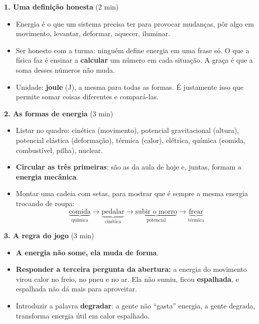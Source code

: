 \documentclass[11pt,a4paper]{article}
\begin{document}
\begin{quadro}
\textbf{1. Uma defini\c{c}\~ao honesta} (2 min)
\begin{itemize}[nosep]
  \item {Energia \'e o que um sistema
        precisa ter para provocar mudan\c{c}as}, p\^or algo em
        movimento, levantar, deformar, aquecer, iluminar.
  \item Ser honesto com a turma: ningu\'em define energia em uma frase
        s\'o. O que a f\'isica faz \'e ensinar a \textbf{calcular} um
        n\'umero em cada situa\c{c}\~ao. A gra\c{c}a \'e que a soma
        desses n\'umeros n\~ao muda.
  \item Unidade: \textbf{joule} (J), a mesma para todas as formas. \'E
        justamente isso que permite somar coisas diferentes e
        compar\'a-las.
\end{itemize}

\medskip
\textbf{2. As formas de energia} (3 min)
\begin{itemize}[nosep]
  \item Listar no quadro: cin\'etica (movimento), potencial
        gravitacional (altura), potencial el\'astica
        (deforma\c{c}\~ao), t\'ermica (calor), el\'etrica, qu\'imica
        (comida, combust\'ivel, pilha), nuclear.
  \item \textbf{Circular as tr\^es primeiras}: s\~ao as da aula de hoje
        e, juntas, formam a \textbf{energia mec\^anica}.
  \item Montar uma cadeia com setas, para mostrar que \'e sempre a
        mesma energia trocando de roupa:
        \[
          \underbrace{\text{comida}}_{\text{qu\'imica}} \rightarrow
          \underbrace{\text{pedalar}}_{\text{cin\'etica}} \rightarrow
          \underbrace{\text{subir o morro}}_{\text{potencial}} \rightarrow
          \underbrace{\text{frear}}_{\text{t\'ermica}}
        \]
\end{itemize}

\medskip
\textbf{3. A regra do jogo} (3 min)
\begin{itemize}[nosep]
  \item \textbf{A energia n\~ao some, ela muda de forma}.
  \item \textbf{Responder a terceira pergunta da abertura:} a energia
        do movimento virou calor no freio, no pneu e no ar. Ela n\~ao
        sumiu, ficou \textbf{espalhada}, e espalhada n\~ao d\'a mais
        para aproveitar.
  \item Introduzir a palavra \textbf{degradar}: a gente n\~ao ``gasta''
        energia, a gente degrada, transforma energia \'util em calor
        espalhado.
\end{itemize}
\end{quadro}
\end{document}
